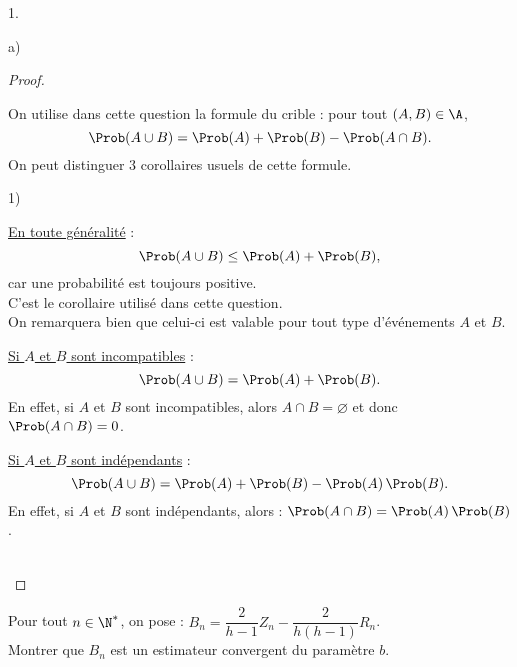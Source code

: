 \begin{noliste}{1.}
\begin{noliste}{a)}
\begin{proof}
      \begin{remark}%
        On utilise dans cette question la formule du crible : pour
        tout $(A,B)\in\A$,
        \[
        \Prob(A\cup B) = \Prob(A) + \Prob(B) - \Prob(A\cap B).
        \]
        On peut distinguer $3$ corollaires usuels de cette formule.
        \begin{noliste}{1)}
        \item \underline{En toute généralité} :
          \[
          \Prob(A\cup B) \leq \Prob(A) + \Prob(B),
          \]
          car une probabilité est toujours positive. \\
          C'est le
          corollaire utilisé dans cette question.\\
          On remarquera bien que celui-ci est valable pour tout
          type d'événements $A$ et $B$.
        \item \underline{Si $A$ et $B$ sont incompatibles} :
          \[
          \Prob(A\cup B) = \Prob(A) + \Prob(B).
          \]
          En effet, si $A$ et $B$ sont incompatibles, alors $A\cap
          B = \varnothing$ et donc $\Prob(A\cap B)=0$.
        \item \underline{Si $A$ et $B$ sont indépendants} :
          \[
          \Prob(A\cup B)=\Prob(A)+\Prob(B)-\Prob(A) \, \Prob(B).
          \]
          En effet, si $A$ et $B$ sont indépendants, alors :
          $\Prob(A\cap B) = \Prob(A) \, \Prob(B)$.
        \end{noliste}
      \end{remark}~\\[-1.4cm]
    \end{proof}
    
  \item Pour tout $n\in\N^*$, on pose : $B_n=\dfrac{2}{h-1}Z_n -
    \dfrac{2}{h(h-1)}R_n$.\\
    Montrer que $B_n$ est un estimateur convergent du paramètre $b$.
    

\end{noliste}
\end{noliste}
